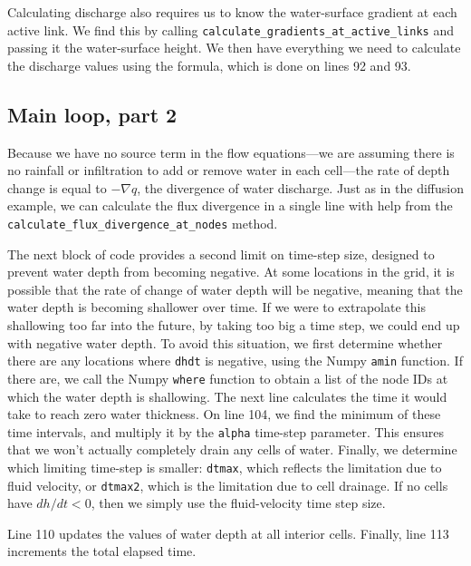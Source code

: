 \documentclass[12pt]{article}
\newcommand{\code}[1]{{\tt #1}}
\begin{document}
Calculating discharge also requires us to know the water-surface gradient at each active link. We find this by calling \code{calculate\_gradients\_at\_active\_links} and passing it the water-surface height. We then have everything we need to calculate the discharge values using the \citet{bates2010simple} formula, which is done on lines 92 and 93.

\subsection{Main loop, part 2}



Because we have no source term in the flow equations---we are assuming there is no rainfall or infiltration to add or remove water in each cell---the rate of depth change is equal to $-\nabla q$, the divergence of water discharge. Just as in the diffusion example, we can calculate the flux divergence in a single line with help from the \code{calculate\_flux\_divergence\_at\_nodes} method.

The next block of code provides a second limit on time-step size, designed to prevent water depth from becoming negative. At some locations in the grid, it is possible that the rate of change of water depth will be negative, meaning that the water depth is becoming shallower over time. If we were to extrapolate this shallowing too far into the future, by taking too big a time step, we could end up with negative water depth. To avoid this situation, we first determine whether there are any locations where \code{dhdt} is negative, using the Numpy \code{amin} function. If there are, we call the Numpy \code{where} function to obtain a list of the node IDs at which the water depth is shallowing. The next line calculates the time it would take to reach zero water thickness. On line 104, we find the minimum of these time intervals, and multiply it by the \code{alpha} time-step parameter. This ensures that we won't actually completely drain any cells of water. Finally, we determine which limiting time-step is smaller: \code{dtmax}, which reflects the limitation due to fluid velocity, or \code{dtmax2}, which is the limitation due to cell drainage. If no cells have $dh/dt<0$, then we simply use the fluid-velocity time step size.

Line 110 updates the values of water depth at all interior cells. Finally, line 113 increments the total elapsed time.
\end{document}

